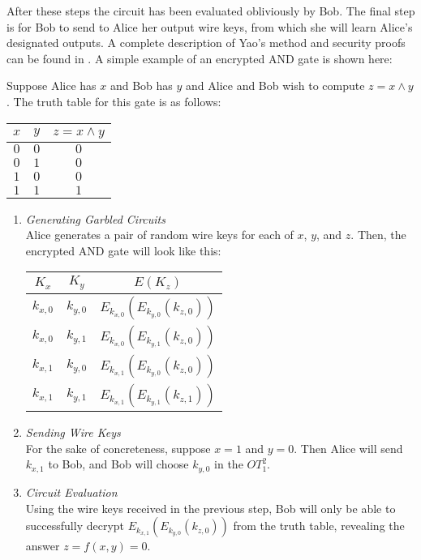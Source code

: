 After these steps the circuit has been evaluated obliviously by Bob.
The final step is for Bob to send to Alice her output wire keys, from
which she will learn Alice's designated outputs. A complete description
of Yao's method and security proofs can be found in \cite{Goldreich:vol2}.
A simple example of an encrypted AND gate is shown here:

\begin{example} 
\label{yao-example}
Suppose Alice has $x$ and Bob has $y$ and Alice and Bob wish to
compute $z=x\wedge y$. The truth table for this gate is as follows:
\begin{tabular}{|c|c|c|}
\hline 
$x$ & $y$ & $z=x\wedge y$\tabularnewline
\hline
\hline 
$0$ & $0$ & $0$\tabularnewline
\hline 
$0$ & $1$ & $0$\tabularnewline
\hline 
$1$ & $0$ & $0$\tabularnewline
\hline 
$1$ & $1$ & $1$\tabularnewline
\hline
\end{tabular}

\begin{enumerate}
\item \emph{Generating Garbled Circuits} \\
Alice generates a pair of random wire keys for each of $x$, $y$,
and $z$. Then, the encrypted AND gate will look like this:
\begin{tabular}{|c|c|c|}
\hline 
$K_{x}$ & $K_{y}$ & $E\left(K_{z}\right)$\tabularnewline
\hline
\hline 
$k_{x,0}$ & $k_{y,0}$ & $E_{k_{x,0}}\left(E_{k_{y,0}}\left(k_{z,0}\right)\right)$\tabularnewline
\hline 
$k_{x,0}$ & $k_{y,1}$ & $E_{k_{x,0}}\left(E_{k_{y,1}}\left(k_{z,0}\right)\right)$\tabularnewline
\hline 
$k_{x,1}$ & $k_{y,0}$ & $E_{k_{x,1}}\left(E_{k_{y,0}}\left(k_{z,0}\right)\right)$\tabularnewline
\hline 
$k_{x,1}$ & $k_{y,1}$ & $E_{k_{x,1}}\left(E_{k_{y,1}}\left(k_{z,1}\right)\right)$\tabularnewline
\hline
\end{tabular}

\item \emph{Sending Wire Keys} \\
For the sake of concreteness, suppose $x=1$ and $y=0$. Then Alice
will send $k_{x,1}$ to Bob, and Bob will choose $k_{y,0}$ in the
$OT_{1}^{2}$. 

\item \emph{Circuit Evaluation} \\
Using the wire keys received in the previous step,
Bob will only be able to successfully decrypt
$E_{k_{x,1}}\left(E_{k_{y,0}}\left(k_{z,0}\right)\right)$ from the
truth table, revealing the answer $z=f(x,y)=0$.
\end{enumerate}
\end{example}

